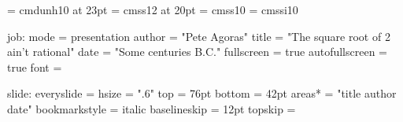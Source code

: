 %
% 
%



\font\maintitlefont  = cmdunh10 at 23pt
\font\slidetitlefont = cmss12   at 20pt
\font\subtitlefont   = cmss10
\font\titlefont      = cmssi10


\setparameter job:
  mode           = presentation %
  author         = "Pete Agoras"
  title          = "The square root of 2 ain't rational"
  date           = "Some centuries B.C."
  fullscreen     = true
  autofullscreen = true
  font           = \tenrm %
  
\setparameter slide:
  everyslide    = \everyslide
  hsize         = ".6\pdfpagewidth"
  top           = 76pt
  bottom        = 42pt
  areas*        = "title author date"
  bookmarkstyle = italic
  baselineskip  = 12pt
  topskip       = \baselineskip

\def\everyslide{%
  \position{topleft}\Title
  \position{topright}\sectiontitle
  \position{titlebar}\slidetitle
  \position{bottomleft}\Author
  \position{bottommiddle}{%
    \noindent
    \dobutton\firstslide\FirstPage
    \dobutton\prevslide\PrevPage
    \dobutton\prevstep\PrevStep\kern.3em
    \dobutton\showbookmarks\Bookmarks\kern.3em
    \dobutton\nextstep\NextStep
    \dobutton\nextslide\NextPage
    \dobutton\lastslide\LastPage\unskip}
  \position{bottomright}\Date
  \presentationonly{
    \position{math}{%
      ${a\over b}=\sqrt2$\par
      $({a\over b})^2=2$\par
      ${a^2\over b^2}=2$\par
      $a^2=2b^2$\par
      $(2k)^2=2b^2$\par
      $4k^2=2b^2$\par
      $2k^2=b^2$\par
      ${a\over b}\neq\sqrt2$}}
  }
\def\dobutton#1#2{%
  #1[push]{\rlap#2\buttonborder}\hskip1em
   }

%
% 

